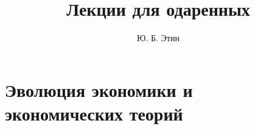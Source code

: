 \documentclass[a4paper,12pt]{book}
\begin{document}
\author{Ю. Б. Этин}
\title{Лекции для одаренных}

\frontmatter
\maketitle
\tableofcontents

\mainmatter
\chapter{Эволюция экономики и экономических теорий}








\backmatter
\end{document}
